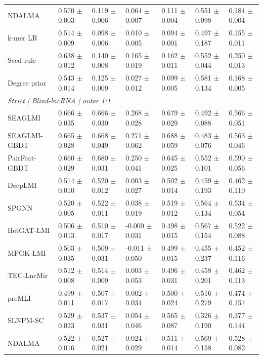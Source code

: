 \begin{landscape}
{\begin{longtable}{lllllll}
NDALMA & 0.570 $\pm$ 0.003 & 0.119 $\pm$ 0.006 & 0.064 $\pm$ 0.007 & 0.111 $\pm$ 0.004 & 0.551 $\pm$ 0.098 & 0.184 $\pm$ 0.004 \\
k-mer LR & 0.514 $\pm$ 0.009 & 0.098 $\pm$ 0.006 & 0.010 $\pm$ 0.005 & 0.094 $\pm$ 0.001 & 0.497 $\pm$ 0.187 & 0.155 $\pm$ 0.011 \\
Seed rule & 0.638 $\pm$ 0.012 & 0.140 $\pm$ 0.008 & 0.165 $\pm$ 0.019 & 0.162 $\pm$ 0.011 & 0.552 $\pm$ 0.044 & 0.250 $\pm$ 0.013 \\
Degree prior & 0.543 $\pm$ 0.014 & 0.125 $\pm$ 0.009 & 0.027 $\pm$ 0.012 & 0.099 $\pm$ 0.005 & 0.581 $\pm$ 0.134 & 0.168 $\pm$ 0.005 \\
\multicolumn{7}{l}{\textit{Strict | Blind-lncRNA | outer 1:1}}\\
SEAGLMI & 0.666 $\pm$ 0.035 & 0.666 $\pm$ 0.030 & 0.268 $\pm$ 0.028 & 0.679 $\pm$ 0.029 & 0.492 $\pm$ 0.088 & 0.566 $\pm$ 0.051 \\
SEAGLMI-GBDT & 0.665 $\pm$ 0.028 & 0.668 $\pm$ 0.049 & 0.271 $\pm$ 0.062 & 0.688 $\pm$ 0.059 & 0.483 $\pm$ 0.076 & 0.563 $\pm$ 0.046 \\
PairFeat-GBDT & 0.660 $\pm$ 0.029 & 0.680 $\pm$ 0.031 & 0.250 $\pm$ 0.041 & 0.645 $\pm$ 0.025 & 0.552 $\pm$ 0.101 & 0.590 $\pm$ 0.056 \\
DeepLMI & 0.514 $\pm$ 0.010 & 0.520 $\pm$ 0.012 & 0.003 $\pm$ 0.027 & 0.502 $\pm$ 0.014 & 0.459 $\pm$ 0.193 & 0.462 $\pm$ 0.110 \\
SPGNN & 0.520 $\pm$ 0.005 & 0.522 $\pm$ 0.011 & 0.038 $\pm$ 0.019 & 0.519 $\pm$ 0.012 & 0.564 $\pm$ 0.134 & 0.534 $\pm$ 0.054 \\
HetGAT-LMI & 0.506 $\pm$ 0.013 & 0.510 $\pm$ 0.017 & -0.000 $\pm$ 0.031 & 0.498 $\pm$ 0.015 & 0.567 $\pm$ 0.154 & 0.522 $\pm$ 0.088 \\
MPGK-LMI & 0.503 $\pm$ 0.035 & 0.509 $\pm$ 0.031 & -0.011 $\pm$ 0.050 & 0.499 $\pm$ 0.015 & 0.455 $\pm$ 0.237 & 0.452 $\pm$ 0.116 \\
TEC-LncMir & 0.512 $\pm$ 0.008 & 0.514 $\pm$ 0.009 & 0.003 $\pm$ 0.053 & 0.496 $\pm$ 0.031 & 0.458 $\pm$ 0.201 & 0.462 $\pm$ 0.113 \\
preMLI & 0.499 $\pm$ 0.011 & 0.507 $\pm$ 0.017 & 0.002 $\pm$ 0.034 & 0.500 $\pm$ 0.024 & 0.516 $\pm$ 0.279 & 0.474 $\pm$ 0.157 \\
SLNPM-SC & 0.529 $\pm$ 0.023 & 0.537 $\pm$ 0.031 & 0.054 $\pm$ 0.046 & 0.565 $\pm$ 0.087 & 0.326 $\pm$ 0.190 & 0.377 $\pm$ 0.144 \\
NDALMA & 0.522 $\pm$ 0.016 & 0.527 $\pm$ 0.021 & 0.024 $\pm$ 0.029 & 0.511 $\pm$ 0.014 & 0.569 $\pm$ 0.158 & 0.528 $\pm$ 0.082 \\

\end{longtable}}
\end{landscape}
